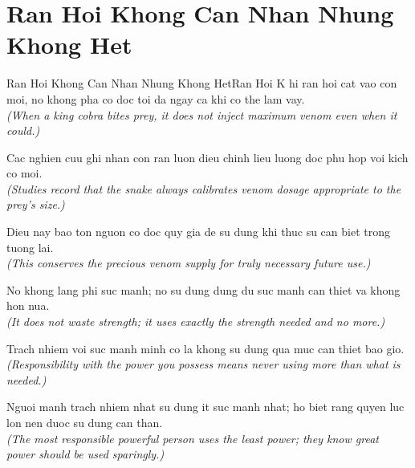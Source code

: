 \section{Ran Hoi Khong Can Nhan Nhung Khong Het}
\begin{truyen}{Ran Hoi Khong Can Nhan Nhung Khong Het}{Ran Hoi}
K hi ran hoi cat vao con moi, no khong pha co doc toi da ngay ca khi co the lam vay.\\
\textit{(When a king cobra bites prey, it does not inject maximum venom even when it could.)}

Cac nghien cuu ghi nhan con ran luon dieu chinh lieu luong doc phu hop voi kich co moi.\\
\textit{(Studies record that the snake always calibrates venom dosage appropriate to the prey's size.)}

Dieu nay bao ton nguon co doc quy gia de su dung khi thuc su can biet trong tuong lai.\\
\textit{(This conserves the precious venom supply for truly necessary future use.)}

No khong lang phi suc manh; no su dung dung du suc manh can thiet va khong hon nua.\\
\textit{(It does not waste strength; it uses exactly the strength needed and no more.)}

Trach nhiem voi suc manh minh co la khong su dung qua muc can thiet bao gio.\\
\textit{(Responsibility with the power you possess means never using more than what is needed.)}

\end{truyen}
\begin{baihoc}
  Nguoi manh trach nhiem nhat su dung it suc manh nhat; ho biet rang quyen luc lon nen duoc su dung can than.\\
  \textit{(The most responsible powerful person uses the least power; they know great power should be used sparingly.)}
\end{baihoc}

